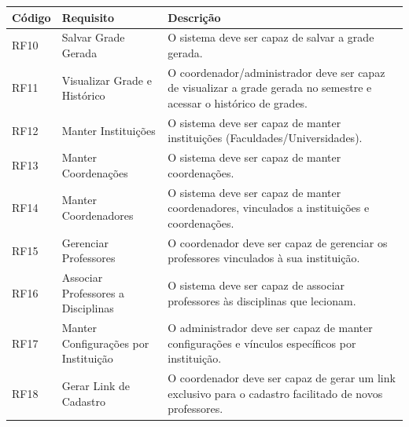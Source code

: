 \newpage
\begin{longtable}{|C{1.8cm}|L{4.5cm}|L{7.1cm}|}
\hline
\textbf{Código} & \textbf{Requisito} & \textbf{Descrição} \\
\hline
\endhead
RF10 & Salvar Grade Gerada & O sistema deve ser capaz de salvar a grade gerada. \\
\hline
RF11 & Visualizar Grade e Histórico & O coordenador/administrador deve ser capaz de visualizar a grade gerada no semestre e acessar o histórico de grades. \\
\hline
RF12 & Manter Instituições & O sistema deve ser capaz de manter instituições (Faculdades/Universidades). \\
\hline
RF13 & Manter Coordenações & O sistema deve ser capaz de manter coordenações. \\
\hline
RF14 & Manter Coordenadores & O sistema deve ser capaz de manter coordenadores, vinculados a instituições e coordenações. \\
\hline
RF15 & Gerenciar Professores & O coordenador deve ser capaz de gerenciar os professores vinculados à sua instituição. \\
\hline
RF16 & Associar Professores a Disciplinas & O sistema deve ser capaz de associar professores às disciplinas que lecionam. \\
\hline
RF17 & Manter Configurações por Instituição & O administrador deve ser capaz de manter configurações e vínculos específicos por instituição. \\
\hline
RF18 & Gerar Link de Cadastro & O coordenador deve ser capaz de gerar um link exclusivo para o cadastro facilitado de novos professores. \\
\hline
\end{longtable}

